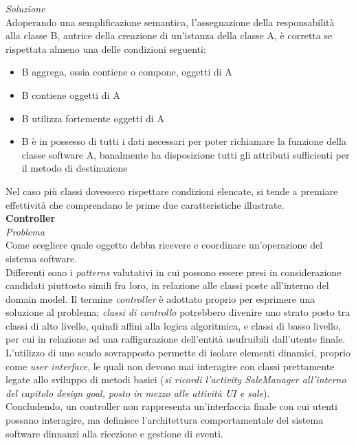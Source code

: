 \documentclass{article}
\begin{document}
\textit{Soluzione}\\
Adoperando una semplificazione semantica, l'assegnazione della responsabilità alla classe B, autrice della creazione di un'istanza della classe A, è corretta se rispettata almeno una delle condizioni seguenti:
\begin{itemize}[label={-}]
    \itemsep0em
    \item B aggrega, ossia contiene o compone, oggetti di A 
    \item B contiene oggetti di A 
    \item B utilizza fortemente oggetti di A
    \item B è in possesso di tutti i dati necessari per poter richiamare la funzione della classe software A, banalmente ha disposizione tutti gli attributi sufficienti per il metodo di destinazione
\end{itemize}
Nel caso più classi dovessero rispettare condizioni elencate, si tende a premiare effettività che comprendano le prime due caratteristiche illustrate.\vspace*{14pt}\\
\textbf{Controller}\vspace*{7pt}\\
\textit{Problema}\\
Come scegliere quale oggetto debba ricevere e coordinare un'operazione del sistema software.\vspace*{7pt}\\
Differenti sono i \textit{patterns} valutativi in cui possono essere presi in considerazione candidati piuttosto simili fra loro, in relazione alle classi poste all'interno del domain model. Il termine \textit{controller} è adottato proprio per esprimere una soluzione al problema; \textit{classi di controllo} potrebbero divenire uno strato posto tra classi di alto livello, quindi affini alla logica algoritmica, e classi di basso livello, per cui in relazione ad una raffigurazione dell'entità usufruibili dall'utente finale. L'utilizzo di uno scudo sovrapposto permette di isolare elementi dinamici, proprio come \textit{user interface}, le quali non devono mai interagire con classi prettamente legate allo sviluppo di metodi basici (\textit{si ricordi l'activity SaleManager all'interno del capitolo design goal, posto in mezzo alle attività UI e sale}).\vspace*{14pt}\\
Concludendo, un controller non rappresenta un'interfaccia finale con cui utenti possano interagire, ma definisce l'architettura comportamentale del sistema software dinnanzi alla ricezione e gestione di eventi.\vspace*{14pt}\\
\end{document}
